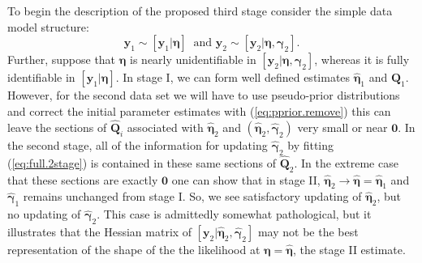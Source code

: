 \documentclass[12pt]{article}
\newcommand{\by}{\mathbf{y}}
\newcommand{\bn}{\boldsymbol{\eta}}
\newcommand{\bg}{\boldsymbol{\gamma}}
\newcommand{\bQ}{\mathbf{Q}}
\begin{document}
To begin the description of the proposed third stage consider the simple data model structure:
\begin{equation}
\by_1 \sim [\by_1|\bn]\ \text{ and } \by_2 \sim [\by_2|\bn,\bg_2].
\end{equation} 
Further, suppose that $\bn$ is nearly unidentifiable in $[\by_2|\bn,\bg_2]$, whereas it is fully identifiable in $[\by_1|\bn]$. In stage I, we can form well defined estimates $\hat{\bn}_1$ and $\hat{\bQ}_1$. However, for the second data set we will have to use pseudo-prior distributions and correct the initial parameter estimates with (\ref{eq:pprior.remove}) this can leave the sections of $\hat{\bQ}_i$ associated with $\hat{\bn}_2$ and $(\hat{\bn}_2, \hat{\bg}_2)$ very small or near $\mathbf{0}$. In the second stage, all of the information for updating $\hat{\bg}_2$ by fitting (\ref{eq:full.2stage}) is contained in these same sections of $\hat{\bQ}_2$. In the extreme case that these sections are exactly $\mathbf{0}$ one can show that in stage II, $\hat{\bn}_2 \to \hat{\bn} = \hat{\bn}_1$ and $\hat{\bg}_1$ remains unchanged from stage I. So, we see satisfactory updating of $\hat{\bn}_2$, but no updating of $\hat{\bg}_2$. This case is admittedly somewhat pathological, but it illustrates that the Hessian matrix of $[\by_2|\hat{\bn}_2, \hat{\bg}_2]$ may not be the best representation of the shape of the the likelihood at $\bn = \hat{\bn}$, the stage II estimate. 
\end{document}
